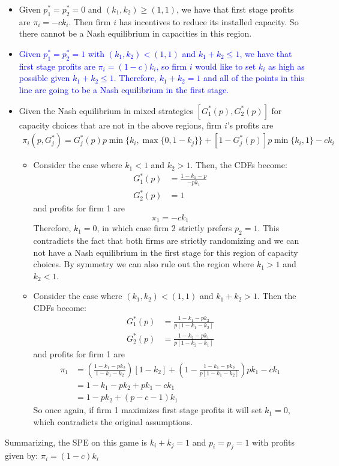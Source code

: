 \documentclass[11pt,english]{article}
\begin{document}
\begin{enumerate}
\begin{itemize}
\item Given $p_{1}^{*}=p_{2}^{*}=0$ and $(k_{1}, k_{2})\geq(1,1)$, we have that first stage profits are $\pi_{i}=-ck_{i}$. Then firm $i$ has incentives to reduce its installed capacity. So there cannot be a Nash equilibrium in capacities in this region.
\item \textcolor{blue}{Given $p_{1}^{*}=p_{2}^{*}=1$ with $(k_{1}, k_{2})<(1,1)$ and $k_{1}+k_{2}\leq1$, we have that first stage profits are $\pi_{i}=(1-c)k_{i}$, so firm $i$ would like to set $k_{i}$ as high as possible given $k_{1}+k_{2}\leq1$. Therefore, $k_{1}+k_{2}=1$ and all of the points in this line are going to be a Nash equilibrium in the first stage.}
\item Given the Nash equilibrium in mixed strategies $[G_{1}^{*}(p), G_{2}^{*}(p)]$ for capacity choices that are not in the above regions, firm $i$'s profits are
 \begin{align}
\pi_{i}(p,G^{*}_{j})=G^{*}_{j}(p)p\min\{k_{i},\max\{0,1-k_{j}\}\}+[1-G^{*}_{j}(p)]p\min\{k_{i},1\}-ck_{i}
\end{align}
\begin{itemize}
\item Consider the case where $k_{1}<1$ and $k_{2}>1$. Then, the CDFs become:
\begin{align}
G_{1}^{*}(p)&=\frac{1-k_{1}-p}{-pk_{1}}\nonumber\\
G_{2}^{*}(p)&=1\nonumber
\end{align}
and profits for firm 1 are 
\begin{equation}
\nonumber
\pi_{1}=-ck_{1}
\end{equation}
Therefore, $k_{1}=0$, in which case firm 2 strictly prefers $p_{2}=1$. This contradicts the fact that both firms are strictly randomizing and we can not have a Nash equilibrium in the first stage for this region of capacity choices. By symmetry we can also rule out the region where $k_{1}>1$ and $k_{2}<1$.

\item Consider the case where $(k_{1},k_{2})<(1,1)$ and $k_{1}+k_{2}>1$. Then the CDFs become:
\begin{align}
G_{1}^{*}(p)&=\frac{1-k_{1}-pk_{2}}{p[1-k_{1}-k_{2}]}\nonumber\\
G_{2}^{*}(p)&=\frac{1-k_{2}-pk_{1}}{p[1-k_{2}-k_{1}]}\nonumber
\end{align}
and profits for firm 1 are 
\begin{align}
\pi_{1}&=\left(\frac{1-k_{1}-pk_{2}}{1-k_{1}-k_{2}}\right) [1-k_{2}]+\left(1- \frac{1-k_{1}-pk_{2}}{p[1-k_{1}-k_{2}]}\right)pk_{1}-ck_{1}\\
&=1-k_{1}-pk_{2}+pk_{1}-ck_{1}\\
&=1-pk_{2}+(p-c-1)k_{1}
\end{align}
So once again, if firm 1 maximizes first stage profits it will set $k_{1}=0$, which contradicts the original assumptions. 
\end{itemize}
\end{itemize}

Summarizing, the SPE on this game is $k_{i}+k_{j}=1$ and $p_{i}=p_{j}=1$ with profits given by: $\pi_{i}=(1-c)k_{i}$

\end{enumerate}
\end{document}
